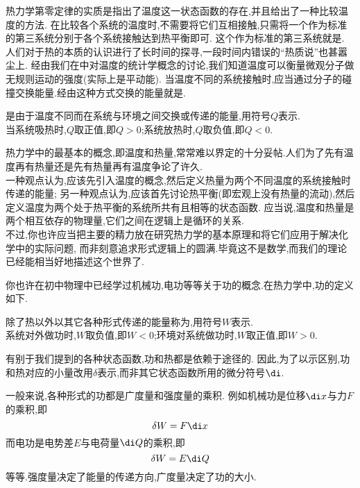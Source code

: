 \documentclass{ctexart}
\begin{document}
热力学第零定律的实质是指出了温度这一状态函数的存在,并且给出了一种比较温度的方法.%
在比较各个系统的温度时,不需要将它们互相接触,只需将一个作为标准的第三系统分别于各个系统接触达到热平衡即可.%
这个作为标准的第三系统就是.\\
\indent 人们对于热的本质的认识进行了长时间的探寻,一段时间内错误的“热质说”也甚嚣尘上.%
经由我们在中对温度的统计学概念的讨论,我们知道温度可以衡量微观分子做无规则运动的强度(实际上是平动能).%
当温度不同的系统接触时,应当通过分子的碰撞交换能量.经由这种方式交换的能量就是.
\begin{definition}[2A.2.3]
    是由于温度不同而在系统与环境之间交换或传递的能量,用符号$Q$表示.\\
    当系统吸热时,$Q$取正值,即$Q>0$;系统放热时,$Q$取负值,即$Q<0$.
\end{definition}
\begin{hint}
    热力学中的最基本的概念,即温度和热量,常常难以界定的十分妥帖.人们为了先有温度再有热量还是先有热量再有温度争论了许久.\\
    一种观点认为,应该先引入温度的概念,然后定义热量为两个不同温度的系统接触时传递的能量;%
    另一种观点认为,应该首先讨论热平衡(即宏观上没有热量的流动),然后定义温度为两个处于热平衡的系统所共有且相等的状态函数.%
    应当说,温度和热量是两个相互依存的物理量,它们之间在逻辑上是循环的关系.\\
    不过,你也许应当把主要的精力放在研究热力学的基本原理和将它们应用于解决化学中的实际问题,%
    而非刻意追求形式逻辑上的圆满.毕竟这不是数学,而我们的理论已经能相当好地描述这个世界了.
\end{hint}
\vspace{8pt}
\indent 你也许在初中物理中已经学过机械功,电功等等关于功的概念.在热力学中,功的定义如下.
\begin{definition}[2A.3.1 功]
    除了热以外以其它各种形式传递的能量称为,用符号$W$表示.\\
    系统对外做功时,$W$取负值,即$W<0$;环境对系统做功时,$W$取正值,即$W>0$.
\end{definition}
\begin{hint}
    有别于我们提到的各种状态函数,功和热都是依赖于途径的.%
    因此,为了以示区别,功和热对应的小量改用$\delta$表示,而非其它状态函数所用的微分符号$\di$.
\end{hint}
一般来说,各种形式的功都是广度量和强度量的乘积.%
例如机械功是位移$\di x$与力$F$的乘积,即
\[\delta W=F\di x\]
而电功是电势差$E$与电荷量$\di Q$的乘积,即
\[\delta W=E\di Q\]
等等.强度量决定了能量的传递方向,广度量决定了功的大小.\\
\end{document}
